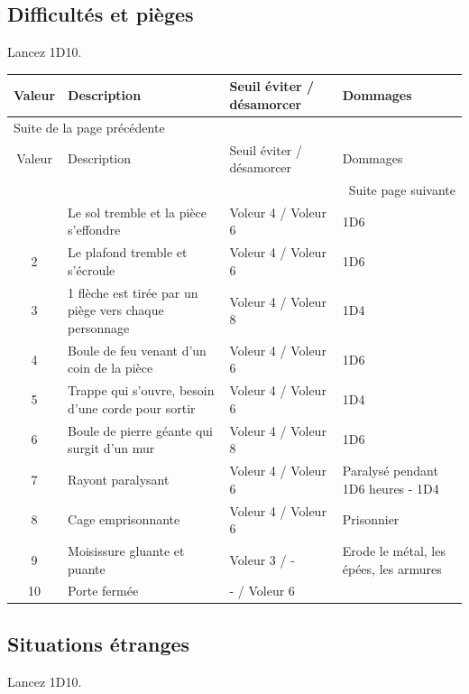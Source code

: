 \documentclass[a4paper, 11pt, twoside]{article}
\begin{document}
\subsection{Difficultés et pièges}
\label{sec:org813b4b1}

Lancez 1D10.

\begin{longtable}{c|p{6cm}|p{3.5cm}|p{4cm}}
Valeur & Description & Seuil éviter / désamorcer & Dommages\\
\hline
\endfirsthead
\multicolumn{4}{l}{Suite de la page précédente} \\
\hline

Valeur & Description & Seuil éviter / désamorcer & Dommages \\

\hline
\endhead
\hline\multicolumn{4}{r}{Suite page suivante} \\
\endfoot
\endlastfoot
\hline
1 & Le sol tremble et la pièce s'effondre & Voleur 4 / Voleur 6 & 1D6\\
2 & Le plafond tremble et s'écroule & Voleur 4 / Voleur 6 & 1D6\\
3 & 1 flèche est tirée par un piège vers chaque personnage & Voleur 4 / Voleur 8 & 1D4\\
4 & Boule de feu venant d'un coin de la pièce & Voleur 4 / Voleur 6 & 1D6\\
5 & Trappe qui s'ouvre, besoin d'une corde pour sortir & Voleur 4 / Voleur 6 & 1D4\\
6 & Boule de pierre géante qui surgit d'un mur & Voleur 4 / Voleur 8 & 1D6\\
7 & Rayont paralysant & Voleur 4 / Voleur 6 & Paralysé pendant 1D6 heures - 1D4\\
8 & Cage emprisonnante & Voleur 4 / Voleur 6 & Prisonnier\\
9 & Moisissure gluante et puante & Voleur 3 / - & Erode le métal, les épées, les armures\\
10 & Porte fermée & - / Voleur 6 & \\
\end{longtable}

\subsection{Situations étranges}
\label{sec:org0b510c3}

Lancez 1D10.
\end{document}
